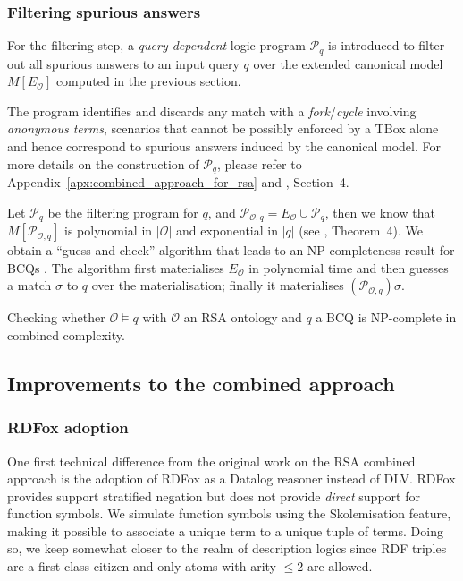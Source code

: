 \documentclass[runningheads]{llncs}
\newcommand{\np}{\textsc{NP}\xspace}
\newcommand{\rdfox}{\mbox{RDFox}\xspace}
\newcommand{\datalog}{\mbox{Datalog}\xspace}
\begin{document}
\subsubsection{Filtering spurious answers}\label{sssec:filtering_spurious_answers}

For the filtering step, a \emph{query dependent} logic program $\mathcal{P}_q$ is introduced to filter out all spurious answers to an input query $q$ over the extended canonical model $M[E_\mathcal{O}]$ computed in the previous section.

The program identifies and discards any match with a \emph{fork}/\emph{cycle} involving \emph{anonymous terms}, scenarios that cannot be possibly enforced by a TBox alone and hence correspond to spurious answers induced by the canonical model.
For more details on the construction of $\mathcal{P}_q$, please refer to Appendix~\ref{apx:combined_approach_for_rsa} and \cite{feier2015}, Section~4.

Let $\mathcal{P}_q$ be the filtering program for $q$, and $\mathcal{P}_{\mathcal{O},q} = E_\mathcal{O} \cup \mathcal{P}_q$, then we know that $M[\mathcal{P}_{\mathcal{O},q}]$ is polynomial in $|\mathcal{O}|$ and exponential in $|q|$ (see \cite{feier2015}, Theorem~4).
We obtain a ``guess and check'' algorithm that leads to an \np-completeness result for BCQs \cite{feier2015}.
The algorithm first materialises $E_\mathcal{O}$ in polynomial time and then guesses a match $\sigma$ to $q$ over the materialisation; finally it materialises $(\mathcal{P}_{\mathcal{O},q})\sigma$.

\begin{theorem}
    Checking whether $\mathcal{O} \models q$ with $\mathcal{O}$ an RSA ontology and $q$ a BCQ is \np-complete in combined complexity.
\end{theorem}

\subsection{Improvements to the combined approach}\label{ssec:improvements_to_rsa_combined_approach}

\subsubsection{\rdfox adoption}\label{sssec:rdfox adoption}

One first technical difference from the original work on the RSA combined approach is the adoption of \rdfox as a \datalog reasoner instead of DLV.
\rdfox provides support stratified negation but does not provide \emph{direct} support for function symbols.
We simulate function symbols using the Skolemisation feature, making it possible to associate a unique term to a unique tuple of terms.
Doing so, we keep somewhat closer to the realm of description logics since RDF triples are a first-class citizen  and only atoms with arity $\le 2$ are allowed.
\end{document}
